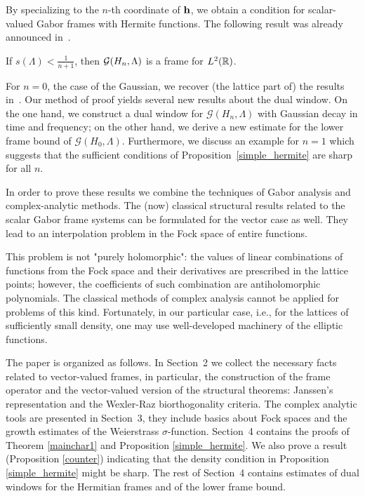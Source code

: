 \documentclass[12pt]{amsart}
\begin{document}
 By specializing to the $n$-th coordinate of $\mathbf {h}$, we obtain a
  condition for scalar-valued Gabor frames with
Hermite functions. The following result was already announced in~\cite{glyu}.

\begin{prop}
\label{simple_hermite}
 If $s(\Lambda ) < \frac{1}{n+1}$, then $\mathcal{G} (H_n , \Lambda )$ is a
 frame for $L^2(\mathbb{R} )$. 
\end{prop}


  For $n=0$, the case of the
 Gaussian, we recover  (the lattice part of) the results
 in~\cite{lyu,sw}. Our method of proof yields several new results
 about the dual window. On the one hand, we construct a dual window
 for $\mathcal{G}(H_n, \Lambda )$ with Gaussian decay in time and
 frequency; on the other hand, we derive a new  estimate for the lower
 frame bound of $\mathcal{G}(H_0, \Lambda )$. 
Furthermore, we discuss  an example
 for $n=1$ which   suggests that the
 sufficient conditions of Proposition~\ref{simple_hermite} are sharp for all $n$.

 
In order to prove these results we combine the   techniques of
Gabor analysis and complex-analytic methods. The (now) classical 
structural results related to  the scalar Gabor frame systems can 
be formulated for the vector case as well.  They lead  to an interpolation
problem in the Fock space of entire functions.

 

 This problem is not  "purely holomorphic":   the values of
 linear combinations of  functions from the Fock space
  and their derivatives are prescribed in the lattice points; however,  the
 coefficients  of such combination  are antiholomorphic polynomials. 
The classical methods of complex analysis cannot be applied for problems
of this kind.  Fortunately,  in our particular case, i.e.,  for the
lattices of sufficiently 
small density,  one may use well-developed machinery of the elliptic functions. 



The paper is organized as follows. In  Section~2 we collect the
necessary facts related to vector-valued frames, in particular, the 
construction of the  frame operator and    
the vector-valued  version of
the structural theorems:  Janssen's representation   and the  Wexler-Raz
biorthogonality criteria. The complex analytic tools  are presented in
Section~3, they include basics about Fock spaces and the growth
estimates of the  Weierstrass  $\sigma$-function. Section~4 contains
the proofs of Theorem  \ref{mainchar1} and Proposition  
\ref{simple_hermite}.  We also prove a result (Proposition \ref{counter}) indicating that
the density condition   in Proposition \ref{simple_hermite}  might be
sharp. The rest of Section~4 contains estimates of dual windows for
the Hermitian frames and of the lower frame bound. 
 
\end{document}
